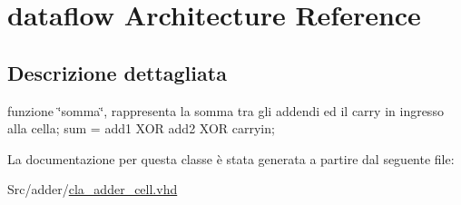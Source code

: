 \hypertarget{classcla__adder__cell_1_1dataflow}{}\section{dataflow Architecture Reference}
\label{classcla__adder__cell_1_1dataflow}


\subsection{Descrizione dettagliata}
funzione \char`\"{}somma\char`\"{}, rappresenta la somma tra gli addendi ed il carry in ingresso alla cella; sum = add1 X\+OR add2 X\+OR carryin; 

La documentazione per questa classe è stata generata a partire dal seguente file\+:\begin{DoxyCompactItemize}
\item 
Src/adder/\hyperlink{cla__adder__cell_8vhd}{cla\+\_\+adder\+\_\+cell.\+vhd}\end{DoxyCompactItemize}
